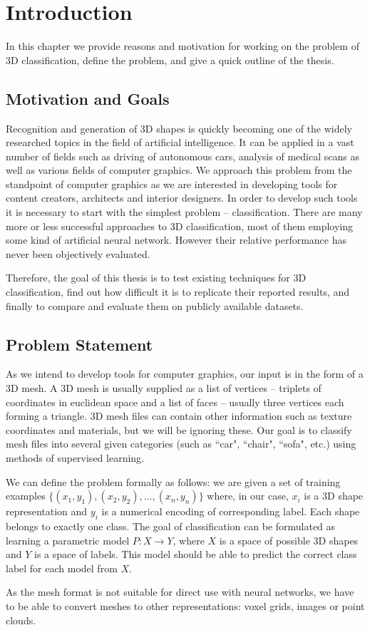 \chapter{Introduction}
\label{sec:chap1}
In this chapter we provide reasons and motivation for working on the problem of 3D classification, define the problem, and give a quick outline of the thesis.

\section{Motivation and Goals}
Recognition and generation of 3D shapes is quickly becoming one of the widely researched topics in the field of artificial intelligence. It can be applied in a vast number of fields such as driving of autonomous cars, analysis of medical scans as well as various fields of computer graphics. We approach this problem from the standpoint of computer graphics as we are interested in developing tools for content creators, architects and interior designers. In order to develop such tools it is necessary to start with the simplest problem -- classification. 
There are many more or less successful approaches to 3D classification, most of them employing some kind of artificial neural network. However their relative performance has never been objectively evaluated.\par
Therefore, the goal of this thesis is to test existing techniques for 3D classification, find out how difficult it is to replicate their reported results, and finally to compare and evaluate them on publicly available datasets.
\section{Problem Statement}
\label{sec:problemstatement}
As we intend to develop tools for computer graphics, our input is in the form of a 3D mesh. A 3D mesh is usually supplied as a list of vertices -- triplets of coordinates in euclidean space and a list of faces -- usually three vertices each forming a triangle. 3D mesh files can contain other information such as texture coordinates and materials, but we will be ignoring these. Our goal is to classify mesh files into several given categories (such as ``car", ``chair", ``sofa", etc.) using methods of supervised learning.\par
We can define the problem formally as follows: we are given a set of training examples $\{(x_1,y_1),(x_2,y_2),\ldots, (x_n,y_n)\}$ where, in our case, $x_i$ is a 3D shape representation and $y_i$ is a numerical encoding of corresponding label. Each shape belongs to exactly one class. The goal of classification can be formulated as learning a parametric model $P:X \rightarrow Y$,  where $X$ is a space of possible 3D shapes and $Y$ is a space of labels. This model should be able to predict the correct class label for each model from $X$. \par
As the mesh format is not suitable for direct use with neural networks, we have to be able to convert meshes to other representations: voxel grids, images or point clouds.
